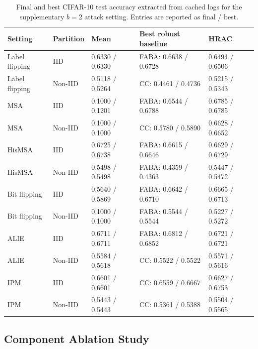 \begin{table}[t]
    \centering
    \scriptsize
    \setlength{\tabcolsep}{3pt}
    \caption{Final and best CIFAR-10 test accuracy extracted from cached logs
    for the supplementary $b=2$ attack setting. Entries are reported as final /
    best.}
    \label{tab:final-best-accuracy-b2}
    \begin{tabular}{p{}p{}p{}p{}p{}}
        \hline
        \textbf{Setting} & \textbf{Partition} & \textbf{Mean} & \textbf{Best robust baseline} & \textbf{HRAC} \\
        \hline
        Label flipping & IID & 0.6330 / 0.6330 & FABA: 0.6638 / 0.6728 & 0.6494 / 0.6506 \\
        Label flipping & Non-IID & 0.5118 / 0.5264 & CC: 0.4461 / 0.4736 & 0.5215 / 0.5343 \\
        MSA & IID & 0.1000 / 0.1201 & FABA: 0.6544 / 0.6788 & 0.6785 / 0.6785 \\
        MSA & Non-IID & 0.1000 / 0.1000 & CC: 0.5780 / 0.5890 & 0.6628 / 0.6652 \\
        HisMSA & IID & 0.6725 / 0.6738 & FABA: 0.6615 / 0.6646 & 0.6629 / 0.6729 \\
        HisMSA & Non-IID & 0.5498 / 0.5498 & FABA: 0.4359 / 0.4363 & 0.5447 / 0.5472 \\
        Bit flipping & IID & 0.5640 / 0.5869 & FABA: 0.6642 / 0.6710 & 0.6665 / 0.6713 \\
        Bit flipping & Non-IID & 0.1000 / 0.1000 & FABA: 0.5544 / 0.5544 & 0.5227 / 0.5272 \\
        ALIE & IID & 0.6711 / 0.6711 & FABA: 0.6812 / 0.6852 & 0.6721 / 0.6721 \\
        ALIE & Non-IID & 0.5584 / 0.5618 & CC: 0.5522 / 0.5522 & 0.5571 / 0.5616 \\
        IPM & IID & 0.6601 / 0.6601 & CC: 0.6559 / 0.6667 & 0.6627 / 0.6753 \\
        IPM & Non-IID & 0.5443 / 0.5443 & CC: 0.5361 / 0.5388 & 0.5504 / 0.5565 \\
        \hline
    \end{tabular}
\end{table}

\subsection{Component Ablation Study}
\label{subsec:component-ablation}

